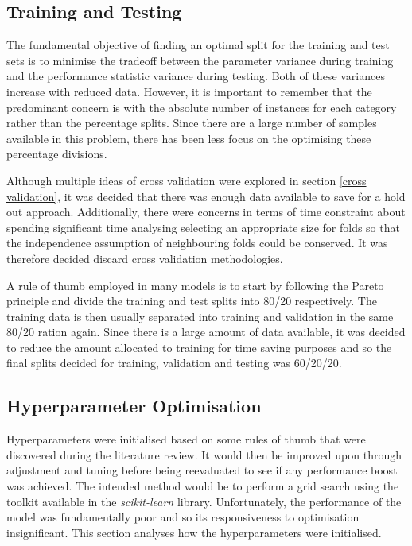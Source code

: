 \documentclass[10pt,onecolumn,letterpaper]{article}
\begin{document}
\subsection{Training and Testing} 

The fundamental objective of finding an optimal split for the training and test sets is to minimise the tradeoff between the parameter variance during training and the performance statistic variance during testing. Both of these variances increase with reduced data. However, it is important to remember that the predominant concern is with the absolute number of instances for each category rather than the percentage splits. Since there are a large number of samples available in this problem, there has been less focus on the optimising these percentage divisions. 

Although multiple ideas of cross validation were explored in section \ref{cross validation}, it was decided that there was enough data available to save for a hold out approach. Additionally, there were concerns in terms of time constraint about spending significant time analysing selecting an appropriate size for folds so that the independence assumption of neighbouring folds could be conserved. It was therefore decided discard cross validation methodologies.

A rule of thumb employed in many models is to start by following the Pareto principle and divide the training and test splits into 80/20 respectively. The training data is then usually separated into training and validation in the same 80/20 ration again. Since there is a large amount of data available, it was decided to reduce the amount allocated to training for time saving purposes and so the final splits decided for training, validation and testing was 60/20/20.

\subsection{Hyperparameter Optimisation} 

Hyperparameters were initialised based on some rules of thumb that were discovered during the literature review. It would then be improved upon through adjustment and tuning before being reevaluated to see if any performance boost was achieved. The intended method would be to perform a grid search using the toolkit available in the \textit{scikit-learn} library. Unfortunately, the performance of the model was fundamentally poor and so its responsiveness to optimisation insignificant. This section analyses how the hyperparameters were initialised. 
\end{document}
